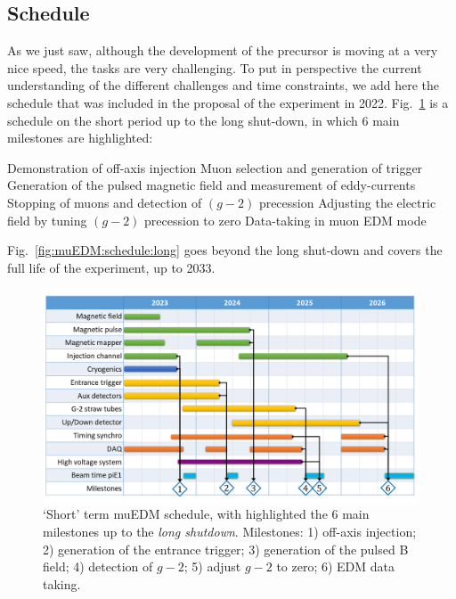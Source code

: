 \begin{refsection}
\section{Schedule}
    As we just saw, although the development of the precursor is moving at a very nice speed, the tasks are very challenging.
    To put in perspective the current understanding of the different challenges and time constraints, we add here the schedule that was included in the proposal of the experiment in 2022.
    Fig.~\ref{fig:muEDM:schedule:short} is a schedule on the short period up to the long shut-down, in which 6 main milestones are highlighted:
    \begin{outline}
        \1[1] Demonstration of off-axis injection
        \1[2] Muon selection and generation of trigger
        \1[3] Generation of the pulsed magnetic field and measurement of eddy-currents
        \1[4] Stopping of muons and detection of $(g - 2)$ precession
        \1[5] Adjusting the electric field by tuning $(g - 2)$ precession to zero
        \1[6] Data-taking in muon EDM mode
    \end{outline}
    Fig.~\ref{fig:muEDM:schedule:long} goes beyond the long shut-down and covers the full life of the experiment, up to 2033.
    
    \begin{figure}
        \centering
        \includegraphics[width = \textwidth]{Figures/muEDM/Schedule2023-2026.png}
        \caption{`Short' term muEDM schedule, with highlighted the 6 main milestones up to the \textit{long shutdown}. Milestones: 1) off-axis injection; 2) generation of the entrance trigger; 3) generation of the pulsed B field; 4) detection of $g-2$; 5) adjust $g-2$ to zero; 6) EDM data taking.}
        \label{fig:muEDM:schedule:short}
    \end{figure}
       

\end{refsection}
